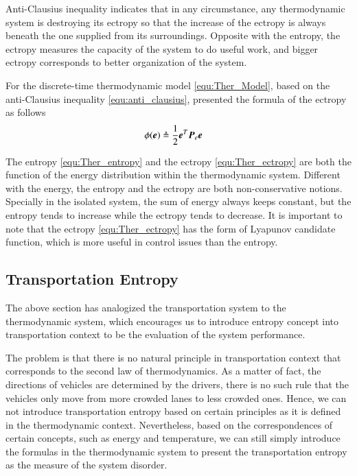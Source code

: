 \documentclass[preprint,authoryear,12pt]{elsarticle}
\renewcommand{\vec}[1]{\mbox{\boldmath$#1$}}
\newcommand{\mat}[1]{\mbox{\boldmath$#1$}}
\begin{document}
Anti-Clausius inequality indicates that in any circumstance, any thermodynamic system is destroying its ectropy so that the increase of the ectropy is always beneath the one supplied from its surroundings. Opposite with the entropy, the ectropy measures the capacity of the system to do useful work, and bigger ectropy corresponds to better organization of the system.

For the discrete-time thermodynamic model \eqref{equ:Ther_Model}, based on the anti-Clausius inequality \eqref{equ:anti_clausius}, \citet{haddad_thermodynamic_2005} presented the formula of the ectropy as follows
\begin{align}
\phi(\vec{e})&\triangleq\frac{1}{2}\vec{e}^T \mat{P}_e \vec{e}
\label{equ:Ther_ectropy}
\end{align}

The entropy \eqref{equ:Ther_entropy} and the ectropy \eqref{equ:Ther_ectropy} are both the function of the energy distribution within the thermodynamic system. Different with the energy, the entropy and the ectropy are both non-conservative notions. Specially in the isolated system, the sum of energy always keeps constant, but the entropy tends to increase while the ectropy tends to decrease. It is important to note that the ectropy \eqref{equ:Ther_ectropy} has the form of Lyapunov candidate function, which is more useful in control issues than the entropy.

\subsection{Transportation Entropy}
The above section has analogized the transportation system to the thermodynamic system, which encourages us to introduce entropy concept into transportation context to be the evaluation of the system performance.

The problem is that there is no natural principle in transportation context that corresponds to the second law of thermodynamics. As a matter of fact, the directions of vehicles are determined by the drivers, there is no such rule that the vehicles only move from more crowded lanes to less crowded ones. Hence, we can not introduce transportation entropy based on certain principles as it is defined in the thermodynamic context. Nevertheless, based on the correspondences of certain concepts, such as energy and temperature, we can still simply introduce the formulas in the thermodynamic system to present the transportation entropy as the measure of the system disorder.
\end{document}
